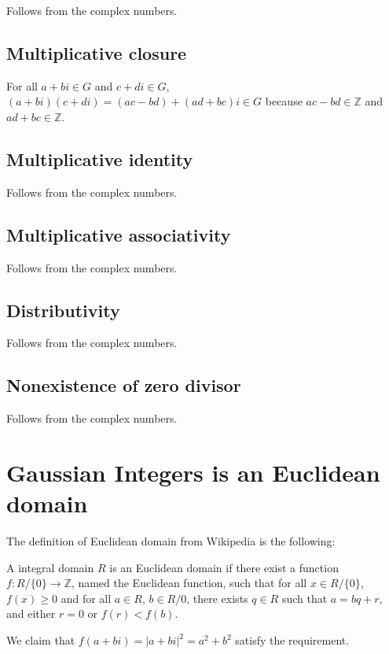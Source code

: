 \documentclass{article}
\begin{document}
Follows from the complex numbers.

\subsection*{Multiplicative closure}

For all $ a + bi \in G $ and $ c + di \in G $, $ (a + bi)(c + di) = (ac-bd) + (ad + bc)i \in G $ because $ ac - bd \in \mathbb{Z} $ and $ ad + bc \in \mathbb{Z} $.

\subsection*{Multiplicative identity}

Follows from the complex numbers.

\subsection*{Multiplicative associativity}

Follows from the complex numbers.

\subsection*{Distributivity}

Follows from the complex numbers.

\subsection*{Nonexistence of zero divisor}

Follows from the complex numbers.

\section*{Gaussian Integers is an Euclidean domain}

The definition of Euclidean domain from Wikipedia is the following:

A integral domain $ R $ is an Euclidean domain if there exist a function $ f: R/\{0\} \to \mathbb{Z} $, named the Euclidean function, such that for all $ x \in R/\{0\} $, $ f(x) \ge 0 $ and for all $ a \in R $, $ b \in R/{0} $, there exists $ q \in R $ such that $ a = bq + r $, and either $ r = 0 $ or $ f(r) < f(b) $.

We claim that $ f(a + bi) = |a+bi|^2 = a^2 + b^2 $ satisfy the requirement.
\end{document}

